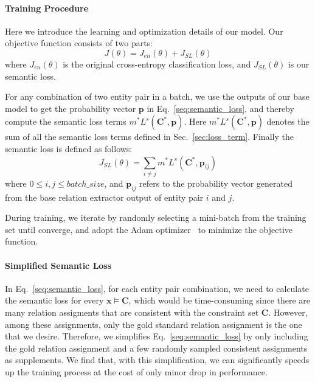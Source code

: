 \paragraph{Training Procedure}
Here we introduce the learning and optimization details of our model. Our objective function consists of two parts:
\begin{equation}
	J(\theta) = J_{en}(\theta) + J_{SL}(\theta)
\end{equation}
where  $J_{en}(\theta)$ is the original cross-entropy classification loss, and $J_{SL}(\theta)$ is our semantic loss.


For any combination of two entity pair in a batch, we use the outputs of our base model to get the probability vector $\bm{p}$ in Eq.~\ref{seq:semantic_loss},
and thereby compute the semantic loss terms $m^{*}L^{s}(\bm{C}^{*}, \bm{p})$.
Here $m^{*}L^{s}(\bm{C}^{*}, \bm{p})$ denotes the sum of all the semantic loss terms defined in Sec.~\ref{sec:loss_term}.
Finally the semantic loss is defined as follows:
\begin{equation}
	J_{SL}(\theta) = \sum\limits_{i \neq j}{m^{*}L^{s}(\bm{C}^{*}, \bm{p}_{ij})}
\end{equation}
where $0\leq i, j \leq batch\_size$, and $\bm{p}_{ij} $ refers to the probability vector generated from the base relation extractor output of entity pair $i$ and $j$.

During training, we iterate by randomly selecting a mini-batch from the training set until converge, and adopt the Adam optimizer~\cite{kingma2014adam} to minimize the objective function.
\paragraph{Simplified Semantic Loss}
In Eq.~\ref{seq:semantic_loss}, for each entity pair combination, we need to calculate the semantic loss for every $\bm x \models \bm{C}$, which would be time-consuming since there are many relation assigments that are consistent with the constraint set $\bm{C}$.
However, among these assignments, only the gold standard relation assignment is the one that we desire.
Therefore, we simplifies Eq.~\ref{seq:semantic_loss} by only including the gold relation assignment and a few randomly sampled consistent assignments as supplements.
We find that, with this simplification, we can significantly speeds up the training process at the cost of only minor drop in performance.


